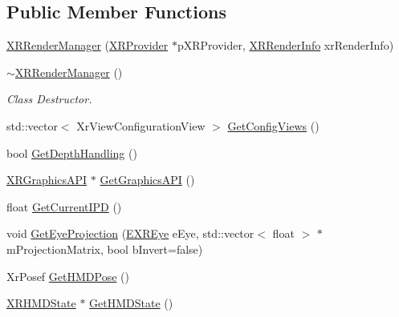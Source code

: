 \subsection*{Public Member Functions}
\begin{DoxyCompactItemize}
\item 
\mbox{\hyperlink{class_open_x_r_provider_1_1_x_r_render_manager_a8ffc871639334f7e2cebfe41f2340b42}{X\+R\+Render\+Manager}} (\mbox{\hyperlink{class_open_x_r_provider_1_1_x_r_provider}{X\+R\+Provider}} $\ast$p\+X\+R\+Provider, \mbox{\hyperlink{struct_open_x_r_provider_1_1_x_r_render_info}{X\+R\+Render\+Info}} xr\+Render\+Info)
\item 
\mbox{\hyperlink{class_open_x_r_provider_1_1_x_r_render_manager_a876800efe7e4a85a4aa291db72fae4ee}{$\sim$\+X\+R\+Render\+Manager}} ()
\begin{DoxyCompactList}\small\item\em Class Destructor. \end{DoxyCompactList}\item 
std\+::vector$<$ Xr\+View\+Configuration\+View $>$ \mbox{\hyperlink{class_open_x_r_provider_1_1_x_r_render_manager_a41bf28f97e9ce4cdae0e8bff1f35a670}{Get\+Config\+Views}} ()
\item 
bool \mbox{\hyperlink{class_open_x_r_provider_1_1_x_r_render_manager_af9c80d37753ba2ae24fe2f1aca91ebd0}{Get\+Depth\+Handling}} ()
\item 
\mbox{\hyperlink{class_open_x_r_provider_1_1_x_r_graphics_a_p_i}{X\+R\+Graphics\+A\+PI}} $\ast$ \mbox{\hyperlink{class_open_x_r_provider_1_1_x_r_render_manager_a7484db5238c64c870c189c8db3403b83}{Get\+Graphics\+A\+PI}} ()
\item 
float \mbox{\hyperlink{class_open_x_r_provider_1_1_x_r_render_manager_abcef1310df0483107fbbb00dd41ff546}{Get\+Current\+I\+PD}} ()
\item 
void \mbox{\hyperlink{class_open_x_r_provider_1_1_x_r_render_manager_ac0960870b34b29fe479feb4ae389abdf}{Get\+Eye\+Projection}} (\mbox{\hyperlink{namespace_open_x_r_provider_a8aa379869e30772896e6c468eb54f155}{E\+X\+R\+Eye}} e\+Eye, std\+::vector$<$ float $>$ $\ast$m\+Projection\+Matrix, bool b\+Invert=false)
\item 
Xr\+Posef \mbox{\hyperlink{class_open_x_r_provider_1_1_x_r_render_manager_a2084c0ea8252e8b601b1bfcdd776f97d}{Get\+H\+M\+D\+Pose}} ()
\item 
\mbox{\hyperlink{struct_open_x_r_provider_1_1_x_r_h_m_d_state}{X\+R\+H\+M\+D\+State}} $\ast$ \mbox{\hyperlink{class_open_x_r_provider_1_1_x_r_render_manager_af6289267e9bf20f6e4d65e4051dd9944}{Get\+H\+M\+D\+State}} ()

\end{DoxyCompactItemize}
